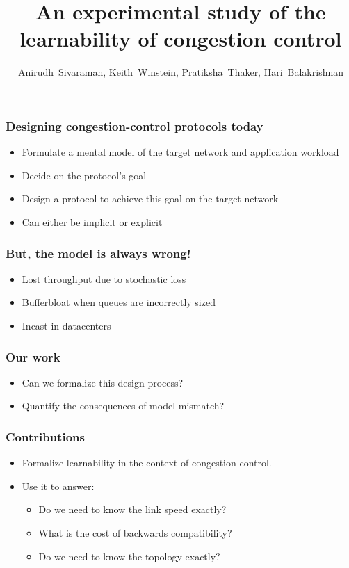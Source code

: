 \documentclass[svgnames]{beamer}
\title{An experimental study of the learnability of congestion control}
\author{Anirudh~Sivaraman, Keith~Winstein, Pratiksha~Thaker, Hari~Balakrishnan}
\institute{MIT CSAIL\vspace{\baselineskip}}
\begin{document}
\begin{frame}

\titlepage

\end{frame}

\begin{Large}
\begin{frame}
\frametitle{Designing congestion-control protocols today}
\begin{itemize}
\item Formulate a mental model of the target network and application workload
\item Decide on the protocol's goal
\item Design a protocol to achieve this goal on the target network
\item Can either be implicit or explicit
\end{itemize}
\end{frame}

\begin{frame}
\frametitle{But, the model is always wrong!}
\begin{itemize}
\item Lost throughput due to stochastic loss 
\item Bufferbloat when queues are incorrectly sized
\item Incast in datacenters
\end{itemize}
\end{frame}

\begin{frame}
\frametitle{Our work}
\begin{itemize}
\item Can we formalize this design process?
\item Quantify the consequences of model mismatch?
\end{itemize}
\end{frame}

\begin{frame}
\frametitle{Contributions}
\begin{itemize}
\item Formalize learnability in the context of congestion control.
\item Use it to answer:
\begin{itemize}
\item Do we need to know the link speed exactly?
\item What is the cost of backwards compatibility?
\item Do we need to know the topology exactly?
\end{itemize}
\end{itemize}
\end{frame}


\end{Large}
\end{document}
